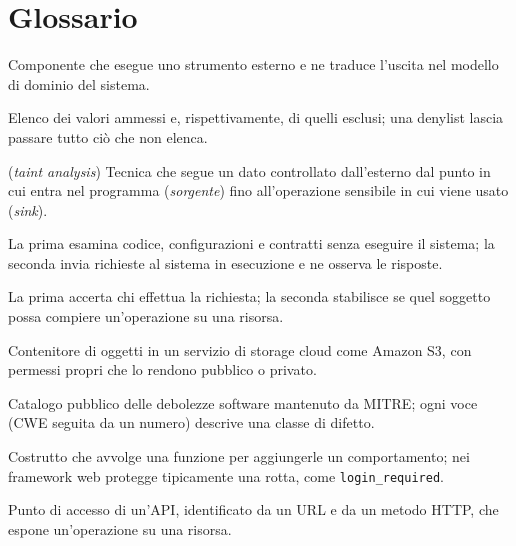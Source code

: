 \section*{Glossario}

{\linespread{1.2}\selectfont
\begin{description}
  \setlength{\itemsep}{2pt}
  \setlength{\parskip}{0pt}

  \item[Adapter] Componente che esegue uno strumento esterno e ne traduce
  l'uscita nel modello di dominio del sistema.

  \item[Allowlist e denylist] Elenco dei valori ammessi e, rispettivamente, di
  quelli esclusi; una denylist lascia passare tutto ciò che non elenca.

  \item[Analisi della contaminazione] (\emph{taint analysis}) Tecnica che segue
  un dato controllato dall'esterno dal punto in cui entra nel programma
  (\emph{sorgente}) fino all'operazione sensibile in cui viene usato
  (\emph{sink}).

  \item[Analisi statica e dinamica] La prima esamina codice, configurazioni e
  contratti senza eseguire il sistema; la seconda invia richieste al sistema in
  esecuzione e ne osserva le risposte.

  \item[Autenticazione e autorizzazione] La prima accerta chi effettua la
  richiesta; la seconda stabilisce se quel soggetto possa compiere
  un'operazione su una risorsa.

  \item[Bucket] Contenitore di oggetti in un servizio di storage cloud come
  Amazon S3, con permessi propri che lo rendono pubblico o privato.

  \item[CWE] Catalogo pubblico delle debolezze software mantenuto da MITRE; ogni
  voce (CWE seguita da un numero) descrive una classe di difetto.

  \item[Decoratore] Costrutto che avvolge una funzione per aggiungerle un
  comportamento; nei framework web protegge tipicamente una rotta, come
  \texttt{login\_required}.

  \item[Endpoint] Punto di accesso di un'API, identificato da un URL e da un
  metodo HTTP, che espone un'operazione su una risorsa.


\end{description}}
